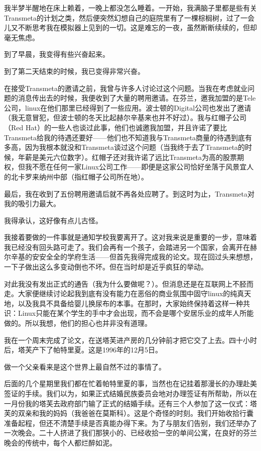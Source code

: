 我半梦半醒地在床上赖着，一晚上都没怎么睡着。一开始，我满脑子里都是些有关Transmeta的计划之类，然后便突然幻想自己的庭院里有了一棵棕榈树，过了一会儿又不断思考我在模拟器上见到的一切。这是难忘的一夜，虽然断断续续的，但却毫无焦虑。

到了早晨，我变得有些兴奋起来。

到了第二天结束的时候，我已变得非常兴奋。

在接受Transmeta的邀请之前，我曾与许多人讨论过这个问题。当我在考虑就业问题的消息传出去的时候，我便收到了大量的聘用邀请。在芬兰，邀我加盟的是Tele公司，linux在他们那里已经得到了一些应用。波士顿的Digital公司也发出了邀请（我无意冒犯，但波士顿的冬天比起赫尔辛基来也并不好过）。我与红帽子公司（Red Hat）的一些人也谈过此事，他们也诚邀我加盟，并且许诺了要比Transmeta给我的待遇还要好——他们也不知道我与Transmeta商量的待遇到底有多高，因为我根本就没和Transmeta谈过这个问题（当我终于去了Transmeta的时候，年薪是美元六位数字）。红帽子还对我许诺了远比Transmeta为高的股票期权，但我不愿在任何一家Linux公司工作——即便是这家公司恰好坐落于风景宜人的北卡罗来纳州中部（指红帽子公司所在地）。

最后，我在收到了五份聘用邀请后就不再各处应聘了。到这时为止，Transmeta对我的吸引力最大。

我得承认，这好像有点儿古怪。

我接着要做的一件事就是通知学校我要离开了。这对我来说是重要的一步，意味着我已经没有回头路可走了。我们会再有一个孩子，会踏进另一个国家，会离开在赫尔辛基的安安全全的学府生活——但首先我得完成我的论文。现在回过头来想想，一下子做出这么多变动倒也不坏。但在当时却是近乎疯狂的举动。

对此我没有发出正式的通告（我为什么要做呢？）。但消息还是在互联网上不胫而走。大家便继续讨论起我到底有没有能力在恶俗的商业氛围中固守linux的纯真天地，以及我具不具备给婴儿换尿布的本事。在那时，大家始终保持着这样一种共识：Linux只能在某个学生的手中才会出现，而不会是哪个安居乐业的成年人所能做的。所以我想，他们的担心也并非没有道理。

我在一个周末完成了论文，在送塔芙进产房的几分钟前才把它交了上去。四十小时后，塔芙产下了帕特里夏。这是1996年的12月5日。

做一个父亲看来是这个世界上最自然不过的事情了。

后面的几个星期里我们都在忙着帕特里夏的事，当然也在记挂着那漫长的办理赴美签证的手续。我们以为，如果正式结婚民族委员会地对办理签证有所帮助，所以在一月份我的塔芙去政府部门输了正式的结婚手续。还有三个人参加了这一仪式：塔芙的双亲和我的妈妈（我爸爸在莫斯科）。这是个奇怪的时刻。我们开始收拾行囊准备起程，但还不清楚手续是否真能办得下来。为了与朋友们告别，我们还举办了一次晚会。二十人挤进了我们那狭小的、已经收拾一空的单间公寓，在良好的芬兰晚会的传统中，每个人都烂醉如泥。

